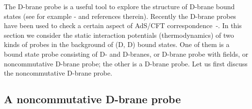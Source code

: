 \documentclass[a4paper,12pt]{article}
\begin{document}
The D-brane probe is a useful tool to explore the structure of D-brane
bound states (see for example \cite{Dou}-\cite{Youm} and references
therein). Recently the D-brane probes have been used to check a certain
aspect of AdS/CFT correspondence~\cite{AA}-\cite{Cai}. In this section
we consider the static interaction potentials (thermodynamics) of two
kinds of probes in the background of (D\coordHE{}, D\coordHE{}) bound states.
One of them is a bound state probe consisting of D\coordHE{}- and D\coordHE{}-branes,
or D\coordHE{}-brane probe with \coordHE{} fields, or noncommutative D\coordHE{}-brane probe;
the other is a D\coordHE{}-brane probe.
Let us first discuss the noncommutative D\coordHE{}-brane probe.


\subsection{A noncommutative D\coordHE{}-brane probe}
\end{document}
